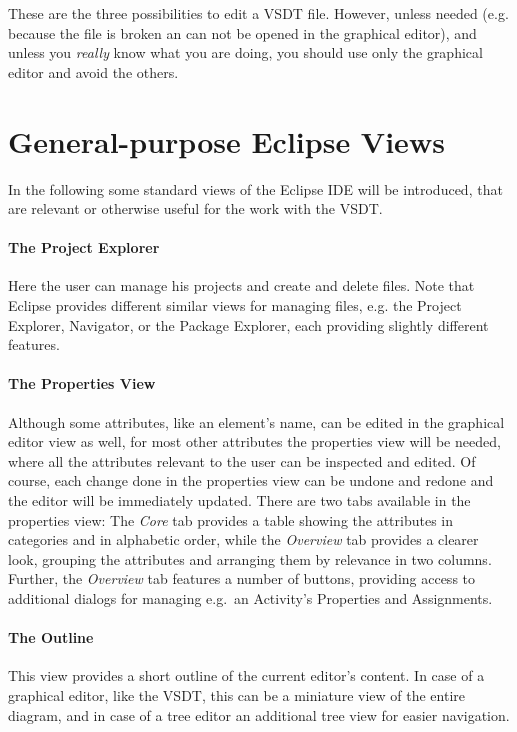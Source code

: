These are the three possibilities to edit a VSDT file.  However, unless needed
(e.g. because the file is broken an can not be opened in the graphical editor),
and unless you \emph{really} know what you are doing, you should use only the
graphical editor and avoid the others.


\section{General-purpose Eclipse Views}

In the following some standard views of the Eclipse IDE will be introduced, that
are relevant or otherwise useful for the work with the VSDT.

\paragraph*{The Project Explorer}
Here the user can manage his projects and create and delete files.  Note that
Eclipse provides different similar views for managing files, e.g. the Project
Explorer, Navigator, or the Package Explorer, each providing slightly different
features.

\paragraph*{The Properties View}
Although some attributes, like an element's name, can be edited in the graphical
editor view as well, for most other attributes the properties view will be needed,
where all the attributes relevant to the user can be inspected and edited.  Of
course, each change done in the properties view can be undone and redone and the
editor will be immediately updated.  There are two tabs available in the properties
view: The \emph{Core} tab provides a table showing the attributes in categories
and in alphabetic order, while the \emph{Overview} tab provides a clearer look,
grouping the attributes and arranging them by relevance in two columns.  Further,
the \emph{Overview} tab features a number of buttons, providing access to
additional dialogs for managing e.g.\ an Activity's Properties and Assignments.

\paragraph*{The Outline}
This view provides a short outline of the current editor's content.  In case of
a graphical editor, like the VSDT, this can be a miniature view of the entire
diagram, and in case of a tree editor an additional tree view for easier navigation.

